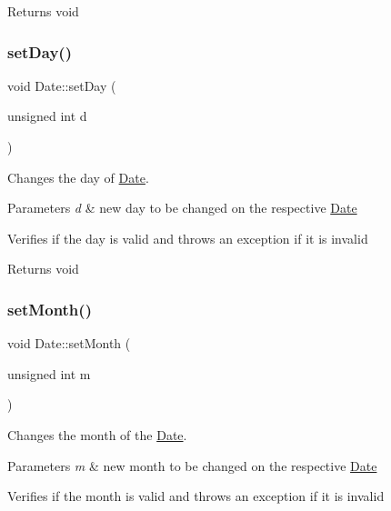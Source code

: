 \begin{DoxyReturn}{Returns}
void 
\end{DoxyReturn}
\mbox{\label{class_date_ad0d7be5956f115287e09fd31d4f91fad}} 
\subsubsection{\texorpdfstring{set\+Day()}{setDay()}}
{\footnotesize\ttfamily void Date\+::set\+Day (\begin{DoxyParamCaption}\item[{unsigned int}]{d }\end{DoxyParamCaption})}



Changes the day of \hyperlink{class_date}{Date}. 


\begin{DoxyParams}{Parameters}
{\em d} & new day to be changed on the respective \hyperlink{class_date}{Date}\\
\hline
\end{DoxyParams}
Verifies if the day is valid and throws an exception if it is invalid

\begin{DoxyReturn}{Returns}
void 
\end{DoxyReturn}
\mbox{\label{class_date_ab2c14958d6ac7b88f37e741e82e456db}} 
\subsubsection{\texorpdfstring{set\+Month()}{setMonth()}}
{\footnotesize\ttfamily void Date\+::set\+Month (\begin{DoxyParamCaption}\item[{unsigned int}]{m }\end{DoxyParamCaption})}



Changes the month of the \hyperlink{class_date}{Date}. 


\begin{DoxyParams}{Parameters}
{\em m} & new month to be changed on the respective \hyperlink{class_date}{Date}\\
\hline
\end{DoxyParams}
Verifies if the month is valid and throws an exception if it is invalid


